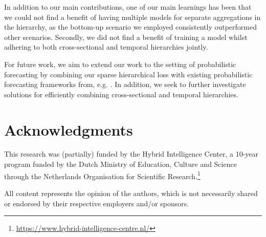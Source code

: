 \documentclass[preprint, 3p, times, twocolumn]{elsarticle}
\begin{document}
  In addition to our main contributions, one of our main learnings has been that we could not find a benefit of having multiple models for separate aggregations in the hierarchy, as the bottom-up scenario we employed consistently outperformed other scenarios. Secondly, we did not find a benefit of training a model whilst adhering to both cross-sectional and temporal hierarchies jointly. 

  For future work, we aim to extend our work to the setting of probabilistic forecasting by combining our sparse hierarchical loss with existing probabilistic forecasting frameworks from, e.g. \cite{sprangers_probabilistic_2021, hasson_probabilistic_2021, stankeviciute_conformal_2021}. In addition, we seek to further investigate solutions for efficiently combining cross-sectional and temporal hierarchies.

\section*{Acknowledgments}
  This research was (partially) funded by the Hybrid Intelligence Center, a 10-year program funded by the Dutch Ministry of Education, Culture and Science through the Netherlands Organisation for Scientific Research.\footnote{\url{https://www.hybrid-intelligence-centre.nl/}}

  All content represents the opinion of the authors, which is not necessarily shared or endorsed by their respective employers and/or sponsors.
  


 


\clearpage

\appendix
\onecolumn
\end{document}

